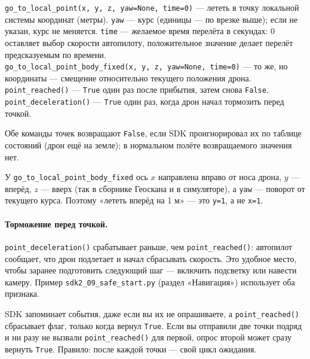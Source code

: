 \begin{codebox}
\verb|go_to_local_point(x, y, z, yaw=None, time=0)| --- лететь в точку локальной системы координат (метры). \verb|yaw| --- курс (единицы --- по врезке выше); если не указан, курс не меняется. \verb|time| --- желаемое время перелёта в секундах: 0 оставляет выбор скорости автопилоту, положительное значение делает перелёт предсказуемым по времени.\\
\verb|go_to_local_point_body_fixed(x, y, z, yaw=None, time=0)| --- то же, но координаты --- смещение относительно текущего положения дрона.\\
\verb|point_reached()| --- \verb|True| один раз после прибытия, затем снова \verb|False|.\\
\verb|point_deceleration()| --- \verb|True| один раз, когда дрон начал тормозить перед точкой.
\end{codebox}

Обе команды точек возвращают \verb|False|, если SDK проигнорировал их по таблице состояний (дрон ещё на земле); в нормальном полёте возвращаемого значения нет.

\begin{infobox}
У \verb|go_to_local_point_body_fixed| ось $x$ направлена вправо от носа дрона, $y$ --- вперёд, $z$ --- вверх (так в сборнике Геоскана и в симуляторе), а \verb|yaw| --- поворот от текущего курса. Поэтому «лететь вперёд на 1 м» --- это \verb|y=1|, а не \verb|x=1|.
\end{infobox}

\paragraph{Торможение перед точкой.} \verb|point_deceleration()| срабатывает раньше, чем \verb|point_reached()|: автопилот сообщает, что дрон подлетает и начал сбрасывать скорость. Это удобное место, чтобы заранее подготовить следующий шаг --- включить подсветку или навести камеру. Пример \texttt{sdk2\_09\_safe\_start.py} (раздел «Навигация») использует оба признака.

\begin{warnbox}
SDK запоминает события, даже если вы их не опрашиваете, а \verb|point_reached()| сбрасывает флаг, только когда вернул \verb|True|. Если вы отправили две точки подряд и ни разу не вызвали \verb|point_reached()| для первой, опрос второй может сразу вернуть \verb|True|. Правило: после каждой точки --- свой цикл ожидания.
\end{warnbox}

